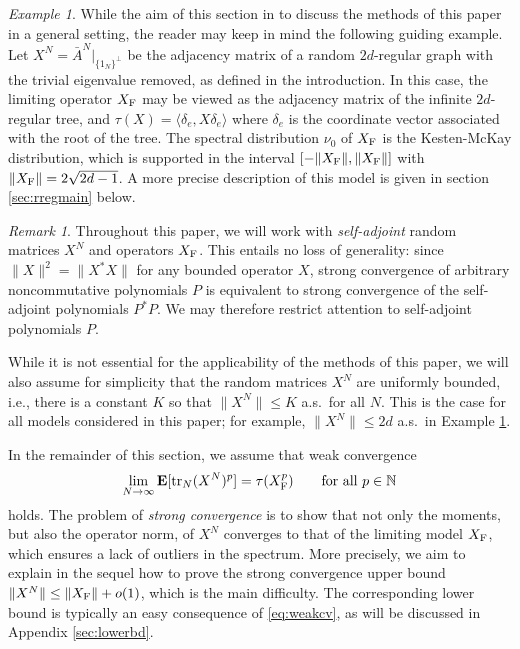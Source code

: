 \documentclass[10pt,reqno]{amsart}
\theoremstyle{definition}
\theoremstyle{remark}
\newtheorem{example}[thm]{Example}
\newtheorem{rem}[thm]{Remark}
\numberwithin{equation}{section}
\numberwithin{figure}{section}
\numberwithin{table}{section}
\newcommand{\ntrN}{\mathop{\mathrm{tr}_N}}
\newcommand{\EE}{\mathbf{E}}
\begin{document}
\begin{example}
\label{ex:rgraph}
While the aim of this section in to discuss the methods of this paper in a 
general setting, the reader may keep in mind the following guiding 
example. Let $X^N=\bar A^N|_{\{1_N\}^\perp}$ be the adjacency matrix of
a random $2d$-regular graph with the trivial eigenvalue removed, as 
defined in the introduction. In this case, the limiting operator $X_{\rm F}$
may be viewed as the adjacency matrix of the infinite $2d$-regular tree, 
and $\tau(X)=\langle \delta_e,X\delta_e\rangle$ where $\delta_e$ is the 
coordinate vector associated with the root of the tree. 
The spectral distribution $\nu_0$ of $X_{\rm F}$ is the 
Kesten-McKay distribution, which is supported in the interval
$[-\|X_{\rm F}\|,\|X_{\rm F}\|]$ with
$\|X_{\rm F}\|=2\sqrt{2d-1}$. A more precise description of 
this model 
is given in section \ref{sec:rregmain} below.
\end{example}

\begin{rem}
\label{rem:sanoloss}
Throughout this paper, we will work with \emph{self-adjoint} random 
matrices $X^N$ and operators $X_{\rm F}$. This entails no loss of 
generality: since $\|X\|^2=\|X^*X\|$ for any bounded operator $X$, strong
convergence of arbitrary noncommutative polynomials $P$ is equivalent to
strong convergence of the self-adjoint polynomials $P^*P$. We may  
therefore restrict attention to self-adjoint polynomials $P$.

While it is not essential for the applicability of the methods of this 
paper, we will also assume for simplicity that the random matrices $X^N$ are 
uniformly bounded, i.e., there is a constant $K$ so that 
$\|X^N\|\le K$ a.s.\ for all $N$. This is the case for all models 
considered in this paper; for example, $\|X^N\|\le 2d$ a.s.\ 
in Example \ref{ex:rgraph}.
\end{rem}

In the remainder of this section, we assume that weak 
convergence
\begin{equation}
\label{eq:weakcv}
	\lim_{N\to\infty}
	\EE[\ntrN (X^N)^p] 
	= \tau(X_{\rm F}^p)
	\qquad\text{for all }p\in\mathbb{N}
\end{equation}
holds.
The problem of \emph{strong convergence} is to show that not only the 
moments, but also the operator norm, of $X^N$ 
converges to that of the limiting model $X_{\rm F}$, which ensures a lack 
of outliers in the spectrum. More precisely, we aim to explain in the 
sequel how to prove the strong convergence upper bound
$\|X^N\| \le \|X_{\rm F}\|+ o(1)$, which is the main difficulty.
The corresponding lower bound is typically an easy consequence of 
\eqref{eq:weakcv}, as will be discussed in Appendix \ref{sec:lowerbd}.
\end{document}
